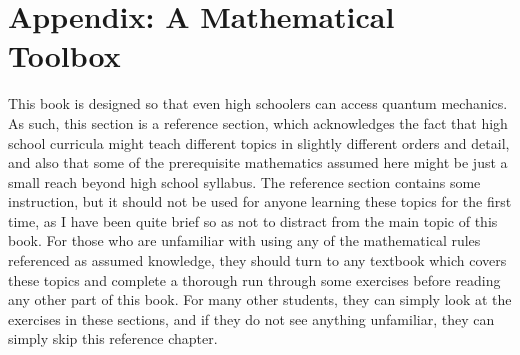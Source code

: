 \chapter{Appendix: A Mathematical Toolbox}
This book is designed so that even high schoolers can access quantum mechanics. As such, this section is a reference section, which acknowledges the fact that high school curricula might teach different topics in slightly different orders and detail, and also that some of the prerequisite mathematics assumed here might be just a small reach beyond high school syllabus. The reference section contains some instruction, but it should not be used for anyone learning these topics for the first time, as I have been quite brief so as not to distract from the main topic of this book. For those who are unfamiliar with using any of the mathematical rules referenced as assumed knowledge, they should turn to any textbook which covers these topics and complete a thorough run through some exercises before reading any other part of this book. For many other students, they can simply look at the exercises in these sections, and if they do not see anything unfamiliar, they can simply skip this reference chapter.
\\\\
